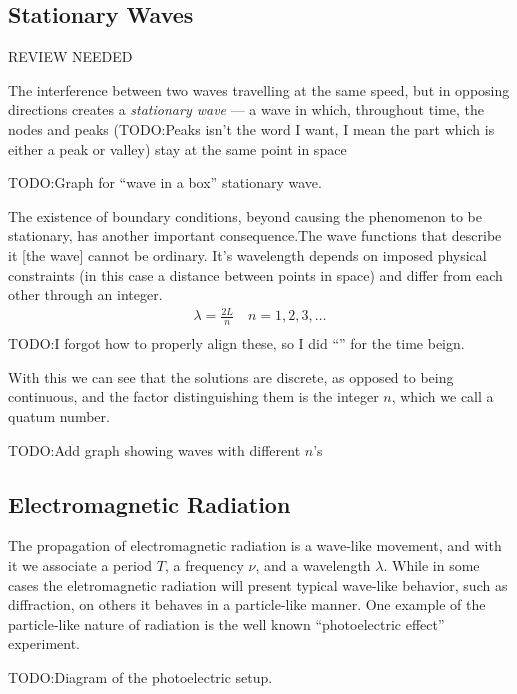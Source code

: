 \documentclass{article}[10pt]
\begin{document}
\subsection{Stationary Waves}
REVIEW NEEDED

The interference between two waves travelling at the same speed, but in opposing
directions creates a \emph{stationary wave} --- a wave in which, throughout
time, the nodes and peaks (TODO:\@ Peaks isn't the word I want, I mean the part
which is either a peak or valley) stay at the same point in space

TODO:\@ Graph for ``wave in a box'' stationary wave.

The existence of boundary conditions, beyond causing the phenomenon to be
stationary, has another important consequence.The wave functions that describe
it [the wave] cannot be ordinary. It's wavelength depends on imposed physical
constraints (in this case a distance between points in space) and differ
from each other through an integer.
\begin{align*}
    \lambda = \frac{2L}{n} \quad n=1,2,3,\ldots \\
\end{align*}
TODO:\@ I forgot how to properly align these, so I did ``\quad'' for the time
beign.

With this we can see that the solutions are discrete, as opposed to being continuous, and the
 factor distinguishing them is the integer $n$, which we call a quatum number.

TODO:\@ Add graph showing waves with different $n$'s
\subsection{Electromagnetic Radiation}
The propagation of electromagnetic radiation is a wave-like movement, and with
it we associate a period $T$, a frequency $\nu$, and a wavelength $\lambda$.
While in some cases the eletromagnetic radiation will present typical wave-like
behavior, such as diffraction, on others it behaves in  a particle-like manner.
One example of the particle-like nature of radiation is the well known
``photoelectric effect'' experiment.

TODO:\@ Diagram of the photoelectric setup.
\end{document}
